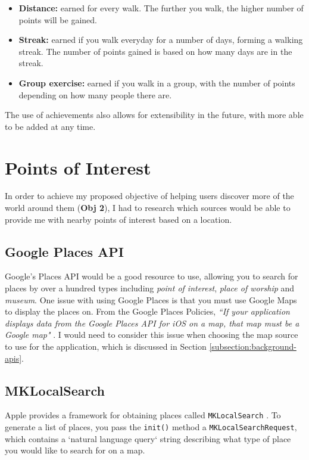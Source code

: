 \begin{itemize}
  \item \textbf{Distance:} earned for every walk. The further you walk, the higher number of points will be gained.
  \item \textbf{Streak:} earned if you walk everyday for a number of days, forming a walking streak. The number of points gained is based on how many days are in the streak.
  \item \textbf{Group exercise:} earned if you walk in a group, with the number of points depending on how many people there are.
\end{itemize}

The use of achievements also allows for extensibility in the future, with more able to be added at any time.

\section{Points of Interest}

In order to achieve my proposed objective of helping users discover more of the world around them (\textbf{Obj 2}), I had to research which sources would be able to provide me with nearby points of interest based on a location.

\subsection{Google Places API}

Google's Places API \cite{GoogleInc.b} would be a good resource to use, allowing you to search for places by over a hundred types including \textit{point of interest}, \textit{place of worship} and \textit{museum}. One issue with using Google Places is that you must use Google Maps to display the places on. From the Google Places Policies, \textit{``If your application displays data from the Google Places API for iOS on a map, that map must be a Google map"} \cite{GoogleInc.c}. I would need to consider this issue when choosing the map source to use for the application, which is discussed in Section \ref{subsection:background-apis}.

\subsection{MKLocalSearch}

Apple provides a framework for obtaining places called \texttt{MKLocalSearch} \cite{AppleInc.b}. To generate a list of places, you pass the \texttt{init()} method a \texttt{MKLocalSearchRequest}, which contains a `natural language query` string describing what type of place you would like to search for on a map.

